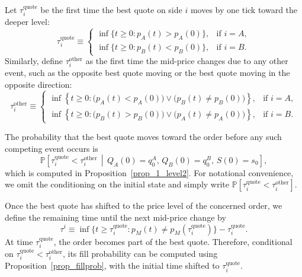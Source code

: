 \documentclass[11pt]{article}
\begin{document}
Let $\tau_i^{\text{quote}}$ be the first time the best quote on side $i$ moves by one tick toward the deeper level:
\begin{equation}
\tau_i^{\text{quote}} \equiv 
\begin{cases}
\inf\{t \geq 0 : p_A(t) > p_A(0)\}, & \text{if } i = A, \\[0.3em]
\inf\{t \geq 0 : p_B(t) < p_B(0)\}, & \text{if } i = B.
\end{cases}
\end{equation}
Similarly, define $\tau_i^{\text{other}}$ as the first time the mid-price changes due to any other event, such as the opposite best quote moving or the best quote moving in the opposite direction:
\begin{equation}
\tau_i^{\text{other}} \equiv 
\begin{cases}
\inf\left\{t \geq 0 : \bigl(p_A(t) < p_A(0)\bigr) \lor \bigl(p_B(t) \neq p_B(0)\bigr)\right\}, 
& \text{if } i = A, \\[0.6em]
\inf\left\{t \geq 0 : \bigl(p_B(t) > p_B(0)\bigr) \lor \bigl(p_A(t) \neq p_A(0)\bigr)\right\}, 
& \text{if } i = B.
\end{cases}
\end{equation}

The probability that the best quote moves toward the order before any such competing event occurs is
\begin{equation}\label{prob_level2_term1}
\mathbb{P}\left[\tau_i^{\text{quote}} < \tau_i^{\text{other}} \,\middle|\,
Q_A(0) = q_0^A,\, Q_B(0) = q_0^B,\, S(0) = s_0
\right],
\end{equation}
which is computed in Proposition~\ref{prop_1_level2}. For notational convenience, we omit the conditioning on the initial state and simply write $\mathbb{P}[\tau_i^{\text{quote}} < \tau_i^{\text{other}}]$.

\medskip
Once the best quote has shifted to the price level of the concerned order, we define the remaining time until the next mid-price change by
\[
\tau^i
\equiv
\inf\{t \geq \tau_i^{\text{quote}} : p_M(t) \neq p_M(\tau_i^{\text{quote}})\}
-\tau_i^{\text{quote}}.
\]
At time $\tau_i^{\text{quote}}$, the order becomes part of the best quote. Therefore, conditional on $\tau_i^{\text{quote}} < \tau_i^{\text{other}}$, its fill probability can be computed using Proposition~\ref{prop_fillprob}, with the initial time shifted to $\tau_i^{\text{quote}}$.
\end{document}
